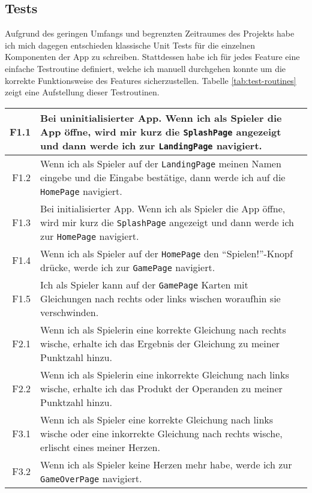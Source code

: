 \subsection{Tests}

Aufgrund des geringen Umfangs und begrenzten Zeitraumes des Projekts habe ich mich dagegen entschieden klassische Unit Tests für die einzelnen Komponenten der App zu schreiben.
Stattdessen habe ich für jedes Feature eine einfache Testroutine definiert, welche ich manuell durchgehen konnte um die korrekte Funktionsweise des Features sicherzustellen.
Tabelle \ref{tab:test-routines} zeigt eine Aufstellung dieser Testroutinen.

\begin{table}
  \begin{longtabu}{| >{\ttfamily} r | X |}
    \hline
    F1.1 & Bei uninitialisierter App. Wenn ich als Spieler die App öffne, wird mir kurz die \texttt{SplashPage} angezeigt und dann werde ich zur \texttt{LandingPage} navigiert. \\
    \hline
    F1.2 & Wenn ich als Spieler auf der \texttt{LandingPage} meinen Namen eingebe und die Eingabe bestätige, dann werde ich auf die \texttt{HomePage} navigiert. \\
    \hline
    F1.3 & Bei initialisierter App. Wenn ich als Spieler die App öffne, wird mir kurz die \texttt{SplashPage} angezeigt und dann werde ich zur \texttt{HomePage} navigiert. \\
    \hline
    F1.4 & Wenn ich als Spieler auf der \texttt{HomePage} den \enquote{Spielen!}-Knopf drücke, werde ich zur \texttt{GamePage} navigiert.\\
    \hline
    F1.5 & Ich als Spieler kann auf der \texttt{GamePage} Karten mit Gleichungen nach rechts oder links wischen woraufhin sie verschwinden.\\
    \hline
    F2.1 & Wenn ich als Spielerin eine korrekte Gleichung nach rechts wische, erhalte ich das Ergebnis der Gleichung zu meiner Punktzahl hinzu.\\
    \hline
    F2.2 & Wenn ich als Spielerin eine inkorrekte Gleichung nach links wische, erhalte ich das Produkt der Operanden zu meiner Punktzahl hinzu.\\
    \hline
    F3.1 & Wenn ich als Spieler eine korrekte Gleichung nach links wische oder eine inkorrekte Gleichung nach rechts wische, erlischt eines meiner Herzen.\\
    \hline
    F3.2 & Wenn ich als Spieler keine Herzen mehr habe, werde ich zur \texttt{GameOverPage} navigiert.\\

\end{longtabu}
\end{table}
